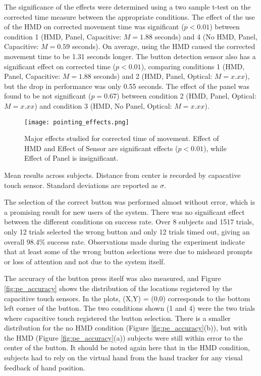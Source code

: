 The significance of the effects were determined using a two sample t-test on the corrected time measure between the appropriate conditions.
The effect of the use of the HMD on corrected movement time was significant ($p < 0.01$) between condition 1 (HMD, Panel, Capacitive: $M=1.88$ seconds) and 4 (No HMD, Panel, Capacitive: $M=0.59$ seconds).
On average, using the HMD caused the corrected movement time to be 1.31 seconds longer.
The button detection sensor also has a significant effect on corrected time ($p < 0.01$), comparing conditions 1 (HMD, Panel, Capacitive: $M=1.88$ seconds) and 2 (HMD, Panel, Optical: $M=x.xx$), but the drop in performance was only 0.55 seconds.
The effect of the panel was found to be not significant ($p=0.67$) between condition 2 (HMD, Panel, Optical: $M=x.xx$) and condition 3 (HMD, No Panel, Optical: $M=x.xx$).

\begin{figure}
    \centering
    \texttt{[image: pointing\_effects.png]}
    \caption{Major effects studied for corrected time of movement. Effect of HMD and Effect of Sensor are significant effects ($p<0.01$), while Effect of Panel is insignificant.}
    \label{fig:pe_effects}
\end{figure}

\begin{table}
    \centering
    \caption{Mean results across subjects. Distance from center is recorded by capacative touch sensor. Standard deviations are reported as $\sigma$.}
    \label{tab:pe_results}
\end{table}

The selection of the correct button was performed almost without error, which is a promising result for new users of the system.
There was no significant effect between the different conditions on success rate.
Over 8 subjects and 1517 trials, only 12 trials selected the wrong button and only 12 trials timed out, giving an overall 98.4\% success rate.
Observations made during the experiment indicate that at least some of the wrong button selections were due to misheard prompts or loss of attention and not due to the system itself.

The accuracy of the button press itself was also measured, and Figure \ref{fig:pe_accuracy} shows the distribution of the locations registered by the capacitive touch sensors.
In the plots, (X,Y) = (0,0) corresponds to the bottom left corner of the button.
The two conditions shown (1 and 4) were the two trials where capacitive touch registered the button selection.
There is a smaller distribution for the no HMD condition (Figure \ref{fig:pe_accuracy}(b)), but with the HMD (Figure \ref{fig:pe_accuracy}(a)) subjects were still within error to the center of the button.
It should be noted again here that in the HMD condition, subjects had to rely on the virtual hand from the hand tracker for any visual feedback of hand position.

